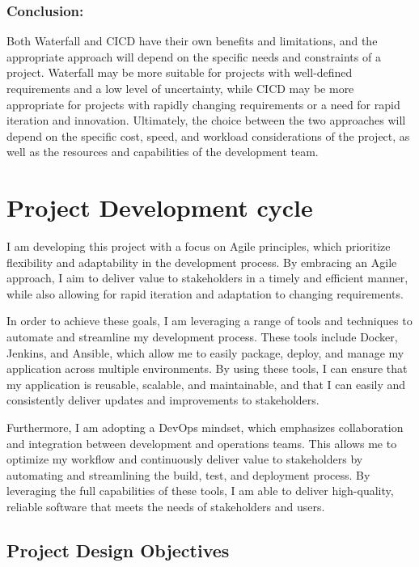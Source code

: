 \documentclass[
  10pt,
  paper=a4,
  ,captions=tableheading
]{scrartcl}
\begin{document}
\hypertarget{conclusion}{%
\subsubsection{Conclusion:}\label{conclusion}}

Both Waterfall and CICD have their own benefits and limitations, and the
appropriate approach will depend on the specific needs and constraints
of a project. Waterfall may be more suitable for projects with
well-defined requirements and a low level of uncertainty, while CICD may
be more appropriate for projects with rapidly changing requirements or a
need for rapid iteration and innovation. Ultimately, the choice between
the two approaches will depend on the specific cost, speed, and workload
considerations of the project, as well as the resources and capabilities
of the development team.

\hypertarget{project-development-cycle}{%
\section{Project Development cycle}\label{project-development-cycle}}

I am developing this project with a focus on Agile principles, which
prioritize flexibility and adaptability in the development process. By
embracing an Agile approach, I aim to deliver value to stakeholders in a
timely and efficient manner, while also allowing for rapid iteration and
adaptation to changing requirements.

In order to achieve these goals, I am leveraging a range of tools and
techniques to automate and streamline my development process. These
tools include Docker, Jenkins, and Ansible, which allow me to easily
package, deploy, and manage my application across multiple environments.
By using these tools, I can ensure that my application is reusable,
scalable, and maintainable, and that I can easily and consistently
deliver updates and improvements to stakeholders.

Furthermore, I am adopting a DevOps mindset, which emphasizes
collaboration and integration between development and operations teams.
This allows me to optimize my workflow and continuously deliver value to
stakeholders by automating and streamlining the build, test, and
deployment process. By leveraging the full capabilities of these tools,
I am able to deliver high-quality, reliable software that meets the
needs of stakeholders and users.

\hypertarget{project-design-objectives}{%
\subsection{Project Design Objectives}\label{project-design-objectives}}
\end{document}
